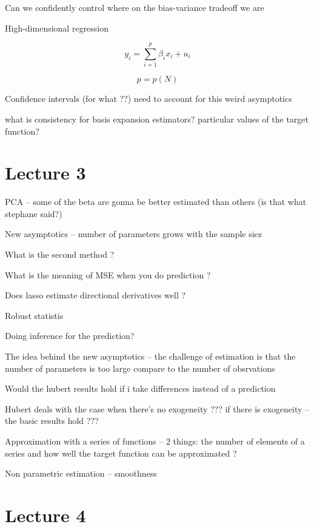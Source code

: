 \documentclass[a4paper,12pt,twoside]{article}
\begin{document}
Can we confidently control where on the bias-variance tradeoff we are

High-dimensional regression

\begin{equation}
	y_i = \sum_{i = 1}^p \beta_i x_i + u_i
\end{equation}

\begin{equation}
	p = p (N)
\end{equation}

Confidence intervals (for what ??) need to account for this weird asymptotics

what is consistency for basis expansion estimators? particular values of the target function?	


\section*{Lecture 3}


PCA -- some of the beta are gonna be better estimated than others  (is that what stephane said?)


New asymptotics -- number of parameters grows with the sample siez


What is the second method ?


What is the meaning of MSE when you do prediction ?

Does lasso estimate directional derivatives well ?


Robust statistis

Doing inference for the prediction?

The idea behind the new asymptotics -- the challenge of estimation is that the number of parameters is too large compare to the number of obsrvations


Would the hubert results hold if i take differences instead of a prediction	

Hubert deals with the case when there's no exogeneity ??? if there is exogeneity -- the basic results hold ???



Approximation with a series of functions -- 2 things: the number of elements of a series and how well the target function can be approximated ?


Non parametric estimation -- smoothness


\section*{Lecture 4}
\end{document}
